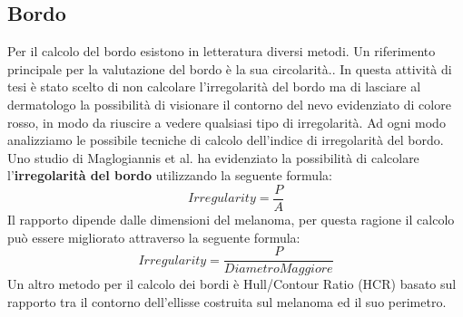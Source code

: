 {\subsection{Bordo}
Per il calcolo del bordo esistono in letteratura diversi metodi.
\newline
Un riferimento principale per la valutazione del bordo è la sua circolarità.\cite{montero2009state}.
In questa attività di tesi è stato scelto di non calcolare l'irregolarità del bordo ma di lasciare al dermatologo la possibilità di visionare il contorno del nevo evidenziato di colore rosso, in modo da riuscire a vedere qualsiasi tipo di irregolarità.
\newline
Ad ogni modo analizziamo le possibile tecniche di calcolo dell'indice di irregolarità del bordo.
Uno studio di Maglogiannis et al. \cite{maglogiannis2005integrated} ha evidenziato la possibilità di calcolare l'\textbf{irregolarità del bordo} utilizzando la seguente formula:
		\begin{equation}
			Irregularity= \frac{P}{A}
		\end{equation}
Il rapporto dipende dalle dimensioni del melanoma, per questa ragione il calcolo può essere migliorato attraverso la seguente formula:
		\begin{equation}
			Irregularity= \frac{P}{Diametro Maggiore}
		\end{equation}
Un altro metodo per il calcolo dei bordi è Hull/Contour Ratio (HCR) \cite{ramlakhan2011mobile} basato sul rapporto tra il contorno dell'ellisse costruita sul melanoma ed il suo perimetro.
}
\newpage
